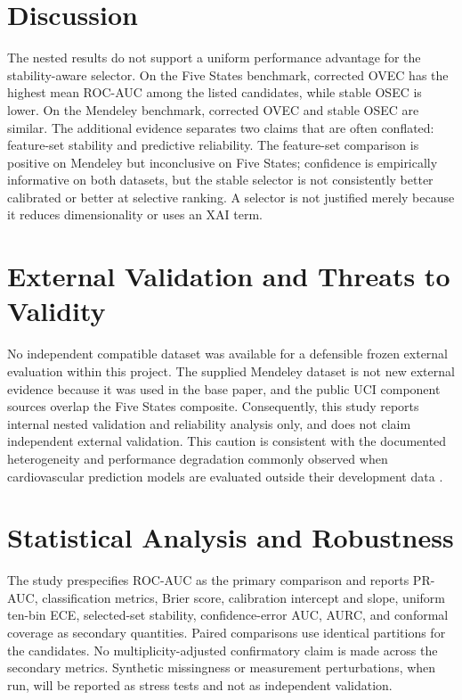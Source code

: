 \documentclass[journal]{IEEEtran}
\begin{document}
\begin{table}[t]
\centering
\caption{Paired stability--reliability linkage. $\Phi$ is cross-seed selected-
set stability. $\Delta$ values are stable OSEC minus corrected OSEC means; the
full bootstrap intervals are stored in the machine-readable linkage artifacts.}
\label{tab:linkage}

\end{table}

\section{Discussion}
The nested results do not support a uniform performance advantage for the
stability-aware selector. On the Five States benchmark, corrected OVEC has the
highest mean ROC-AUC among the listed candidates, while stable OSEC is lower.
On the Mendeley benchmark, corrected OVEC and stable OSEC are similar. The
additional evidence separates two claims that are often conflated: feature-set
stability and predictive reliability. The feature-set comparison is positive on
Mendeley but inconclusive on Five States; confidence is empirically informative
on both datasets, but the stable selector is not consistently better calibrated
or better at selective ranking. A selector is not justified merely because it
reduces dimensionality or uses an XAI term.

\section{External Validation and Threats to Validity}
No independent compatible dataset was available for a defensible frozen
external evaluation within this project. The supplied Mendeley dataset is not
new external evidence because it was used in the base paper, and the public UCI
component sources overlap the Five States composite. Consequently, this study
reports internal nested validation and reliability analysis only, and does not
claim independent external validation. This caution is consistent with the
documented heterogeneity and performance degradation commonly observed when
cardiovascular prediction models are evaluated outside their development data
\cite{wessler2021external}.

\section{Statistical Analysis and Robustness}
The study prespecifies ROC-AUC as the primary comparison and reports PR-AUC,
classification metrics, Brier score, calibration intercept and slope, uniform
ten-bin ECE, selected-set stability, confidence-error AUC, AURC, and conformal
coverage as secondary quantities. Paired comparisons use identical partitions
for the candidates. No multiplicity-adjusted confirmatory claim is made across
the secondary metrics. Synthetic missingness or measurement perturbations,
when run, will be reported as stress tests and not as independent validation.
\end{document}

